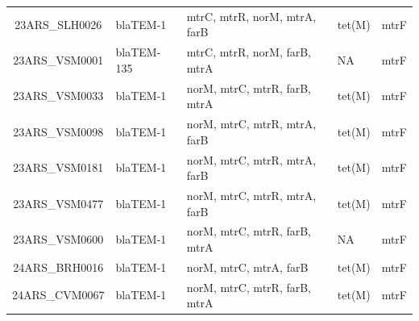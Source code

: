 \documentclass[
  a4paper,
]{article}
\begin{document}
\begin{landscape}
\begin{tabular}{c>{\centering\arraybackslash}p{3cm}>{\centering\arraybackslash}p{3cm}>{\centering\arraybackslash}p{3cm}>{\centering\arraybackslash}p{3cm}}
23ARS\_SLH0026 & blaTEM-1 & mtrC, mtrR, norM, mtrA, farB & tet(M) & mtrF\\
23ARS\_VSM0001 & blaTEM-135 & mtrC, mtrR, norM, farB, mtrA & NA & mtrF\\
\addlinespace
23ARS\_VSM0033 & blaTEM-1 & norM, mtrC, mtrR, farB, mtrA & tet(M) & mtrF\\
23ARS\_VSM0098 & blaTEM-1 & norM, mtrC, mtrR, mtrA, farB & tet(M) & mtrF\\
23ARS\_VSM0181 & blaTEM-1 & norM, mtrC, mtrR, mtrA, farB & tet(M) & mtrF\\
23ARS\_VSM0477 & blaTEM-1 & norM, mtrC, mtrR, mtrA, farB & tet(M) & mtrF\\
23ARS\_VSM0600 & blaTEM-1 & norM, mtrC, mtrR, farB, mtrA & NA & mtrF\\
\addlinespace
24ARS\_BRH0016 & blaTEM-1 & norM, mtrC, mtrA, farB & tet(M) & mtrF\\
24ARS\_CVM0067 & blaTEM-1 & norM, mtrC, mtrR, farB, mtrA & tet(M) & mtrF\\
\bottomrule
\end{tabular}

\end{landscape}
\end{document}
